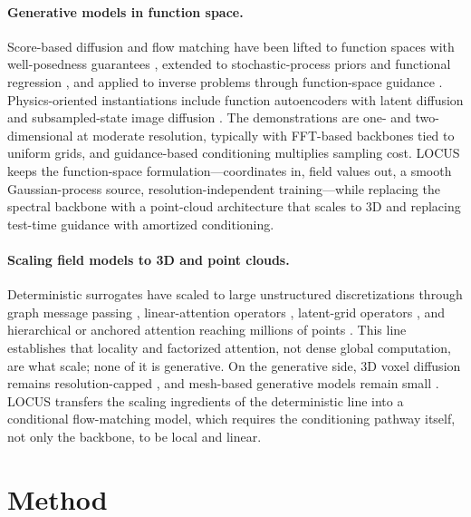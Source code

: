 \documentclass{article} %
\newcommand{\model}{LOCUS}
\begin{document}
\paragraph{Generative models in function space.}
Score-based diffusion and flow matching have been lifted to function spaces with well-posedness guarantees \citep{lim2025score,pidstrigach2024infinite,kerrigan2024functional,franzese2023continuous}, extended to stochastic-process priors and functional regression \citep{shi2024universal,shi2025stochastic}, and applied to inverse problems through function-space guidance \citep{yao2025fundps,baldassari2023conditional,kerrigan2024dynamic}. Physics-oriented instantiations include function autoencoders with latent diffusion \citep{wang2026fundiff} and subsampled-state image diffusion \citep{bond2024infty}. The demonstrations are one- and two-dimensional at moderate resolution, typically with FFT-based backbones tied to uniform grids, and guidance-based conditioning multiplies sampling cost. \model{} keeps the function-space formulation---coordinates in, field values out, a smooth Gaussian-process source, resolution-independent training---while replacing the spectral backbone with a point-cloud architecture that scales to 3D and replacing test-time guidance with amortized conditioning.

\paragraph{Scaling field models to 3D and point clouds.}
Deterministic surrogates have scaled to large unstructured discretizations through graph message passing \citep{pfaff2021learning}, linear-attention operators \citep{hao2023gnot,wu2024transolver}, latent-grid operators \citep{li2023gino}, and hierarchical or anchored attention reaching millions of points \citep{luo2025transolver,alkin2024upt,alkin2025abupt}. This line establishes that locality and factorized attention, not dense global computation, are what scale; none of it is generative. On the generative side, 3D voxel diffusion remains resolution-capped \citep{lienen2024zero,li2023factformer,holzschuh2026pd3}, and mesh-based generative models remain small \citep{lino2025dgn}. \model{} transfers the scaling ingredients of the deterministic line into a conditional flow-matching model, which requires the conditioning pathway itself, not only the backbone, to be local and linear.

\section{Method}
\label{sec:method}
\end{document}
